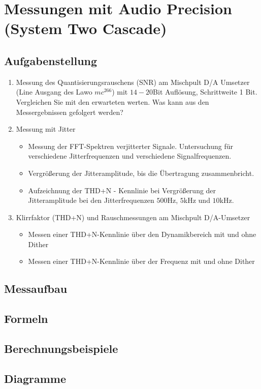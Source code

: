 \section{Messungen mit Audio Precision (System Two Cascade)}
\subsection{Aufgabenstellung}
\begin{enumerate}
\item Messung des Quantisierungsrauschens (SNR) am Mischpult D/A Umsetzer (Line Ausgang des Lawo $mc^266$) mit $14-20$Bit Auflösung, Schrittweite 1 Bit. Vergleichen Sie mit den erwarteten werten. Was kann aus den Messergebnissen gefolgert werden?
\item Messung mit Jitter \begin{itemize}
\item Messung der FFT-Spektren verjitterter Signale. Untersuchung für verschiedene Jitterfrequenzen und verschiedene Signalfrequenzen.
\item Vergrößerung der Jitteramplitude, bis die Übertragung zusammenbricht.
\item Aufzeichnung der THD+N - Kennlinie bei Vergrößerung der Jitteramplitude bei den Jitterfrequenzen $500$Hz, $5$kHz und $10$kHz. 
\end{itemize}
\item Klirrfaktor (THD+N) und Rauschmessungen am Mischpult D/A-Umsetzer
\begin{itemize}
\item Messen einer THD+N-Kennlinie über den Dynamikbereich mit und ohne Dither
\item Messen einer THD+N-Kennlinie über der Frequenz mit und ohne Dither
\end{itemize}
\end{enumerate}
\subsection{Messaufbau}

\subsection{Formeln}

\subsection{Berechnungsbeispiele}

\subsection{Diagramme}

